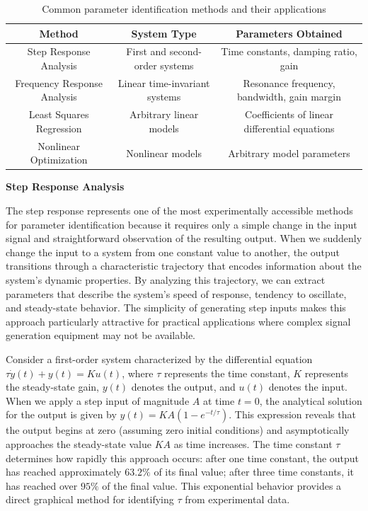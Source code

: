 \begin{table}[htbp]
\centering
\caption{Common parameter identification methods and their applications}
\begin{tabular}{|c|c|c|}
\hline
\textbf{Method} & \textbf{System Type} & \textbf{Parameters Obtained} \\
\hline
Step Response Analysis & First and second-order systems & Time constants, damping ratio, gain \\
\hline
Frequency Response Analysis & Linear time-invariant systems & Resonance frequency, bandwidth, gain margin \\
\hline
Least Squares Regression & Arbitrary linear models & Coefficients of linear differential equations \\
\hline
Nonlinear Optimization & Nonlinear models & Arbitrary model parameters \\
\hline
\end{tabular}
\label{tab:identification_methods}
\end{table}

\textbf{Step Response Analysis}

The step response represents one of the most experimentally accessible methods for parameter identification because it requires only a simple change in the input signal and straightforward observation of the resulting output. When we suddenly change the input to a system from one constant value to another, the output transitions through a characteristic trajectory that encodes information about the system's dynamic properties. By analyzing this trajectory, we can extract parameters that describe the system's speed of response, tendency to oscillate, and steady-state behavior. The simplicity of generating step inputs makes this approach particularly attractive for practical applications where complex signal generation equipment may not be available.

Consider a first-order system characterized by the differential equation $\tau \dot{y}(t) + y(t) = K u(t)$, where $\tau$ represents the time constant, $K$ represents the steady-state gain, $y(t)$ denotes the output, and $u(t)$ denotes the input. When we apply a step input of magnitude $A$ at time $t = 0$, the analytical solution for the output is given by $y(t) = KA\left(1 - e^{-t/\tau}\right)$. This expression reveals that the output begins at zero (assuming zero initial conditions) and asymptotically approaches the steady-state value $KA$ as time increases. The time constant $\tau$ determines how rapidly this approach occurs: after one time constant, the output has reached approximately $63.2\%$ of its final value; after three time constants, it has reached over $95\%$ of the final value. This exponential behavior provides a direct graphical method for identifying $\tau$ from experimental data.

